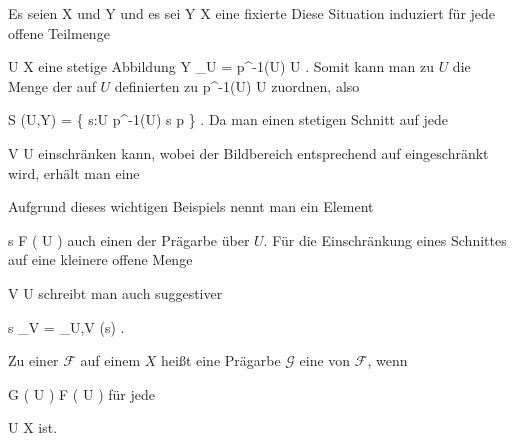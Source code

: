 {





Es seien
\mathkor {} {X} {und} {Y} {}
und es sei
 { Y } { X
} {}
eine fixierte
Diese Situation induziert  für jede offene Teilmenge

\mavergleichskette
{\vergleichskette
{U
}
{ \subseteq }{ X
}
{  }{
}
{    }{
}
{   }{
}
}
{}{}{}
eine stetige Abbildung
\maabbdisp {} {Y \vert_U = p^{-1}(U) } { U
} {.}
Somit kann man zu $U$  die Menge der auf $U$ definierten
zu
\maabb {} { p^{-1}(U) } { U
} {}
zuordnen, also

\mavergleichskettedisp
{\vergleichskette
{ S (U,Y)
}
{ =} { \left\{  s:U \rightarrow p^{-1}(U)  \mid   s  p         \right\}
}
{ } {
}
{ } {
}
{ } {
}
}
{}{}{.}
Da man einen stetigen Schnitt auf jede

\mavergleichskette
{\vergleichskette
{V
}
{ \subseteq }{ U
}
{  }{
}
{    }{
}
{   }{
}
}
{}{}{}
einschränken kann, wobei der Bildbereich entsprechend auf
 eingeschränkt wird, erhält man eine





}

Aufgrund dieses wichtigen Beispiels nennt man ein Element

\mavergleichskette
{\vergleichskette
{s
}
{ \in }{ { \mathcal F  }  \left(  U   \right)
}
{  }{
}
{    }{
}
{   }{
}
}
{}{}{}
auch einen  {} der Prägarbe
 über $U$. Für die Einschränkung eines Schnittes auf eine kleinere offene Menge

\mavergleichskette
{\vergleichskette
{V
}
{ \subseteq }{U
}
{  }{
}
{    }{
}
{   }{
}
}
{}{}{}
schreibt man auch suggestiver

\mavergleichskettedisp
{\vergleichskette
{ s \vert_V
}
{ =} { \rho_{U,V} (s)
}
{ } {
}
{ } {
}
{ } {
}
}
{}{}{.}


{}
{





Zu einer
${ \mathcal  F   }$ auf einem
$X$ heißt eine Prägarbe ${ \mathcal  G   }$ eine
von ${ \mathcal  F   }$, wenn

\mavergleichskette
{\vergleichskette
{ { \mathcal  G   }  \left(   U   \right)
}
{ \subseteq }{ { \mathcal  F   }  \left(   U   \right)
}
{  }{
}
{    }{
}
{   }{
}
}
{}{}{}
für jede

\mavergleichskette
{\vergleichskette
{U
}
{ \subseteq }{ X
}
{  }{
}
{    }{
}
{   }{
}
}
{}{}{}
ist.





}

